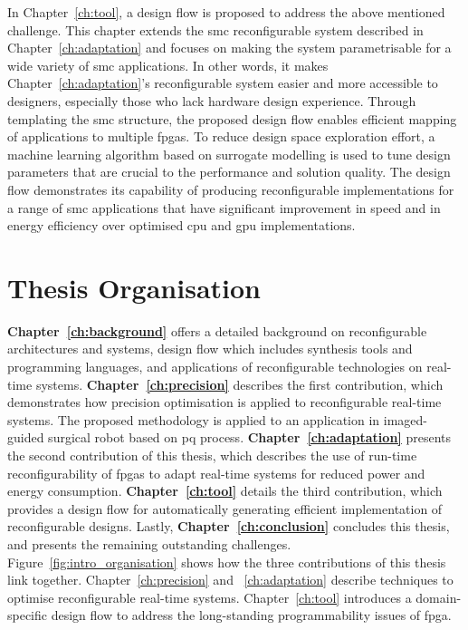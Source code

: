 In Chapter~\ref{ch:tool}, a design flow is proposed to address the above mentioned challenge.
This chapter extends the \gls{smc} reconfigurable system described in Chapter~\ref{ch:adaptation} and focuses on making the system parametrisable for a wide variety of \gls{smc} applications.
In other words, it makes Chapter~\ref{ch:adaptation}'s reconfigurable system easier and more accessible to designers, especially those who lack hardware design experience.
Through templating the \gls{smc} structure, the proposed design flow enables efficient mapping of applications to multiple \glspl{fpga}.
To reduce design space exploration effort, a machine learning algorithm based on surrogate modelling is used to tune design parameters that are crucial to the performance and solution quality.
The design flow demonstrates its capability of producing reconfigurable implementations for a range of \gls{smc} applications that have significant improvement in speed and in energy efficiency over optimised \gls{cpu} and \gls{gpu} implementations.


\section{Thesis Organisation}

\textbf{Chapter~\ref{ch:background}} offers a detailed background on reconfigurable architectures and systems, design flow which includes synthesis tools and programming languages, and applications of reconfigurable technologies on real-time systems.
\textbf{Chapter~\ref{ch:precision}} describes the first contribution, which demonstrates how precision optimisation is applied to reconfigurable real-time systems.
The proposed methodology is applied to an application in imaged-guided surgical robot based on \gls{pq} process. 
\textbf{Chapter~\ref{ch:adaptation}} presents the second contribution of this thesis, which describes the use of run-time reconfigurability of \glspl{fpga} to adapt real-time systems for reduced power and energy consumption.
\textbf{Chapter~\ref{ch:tool}} details the third contribution, which provides a design flow for automatically generating efficient implementation of reconfigurable designs.
Lastly, \textbf{Chapter~\ref{ch:conclusion}} concludes this thesis, and presents the remaining outstanding challenges.
Figure~\ref{fig:intro_organisation} shows how the three contributions of this thesis link together.
Chapter~\ref{ch:precision} and ~\ref{ch:adaptation} describe techniques to optimise reconfigurable real-time systems.
Chapter~\ref{ch:tool} introduces a domain-specific design flow to address the long-standing programmability issues of \gls{fpga}.

